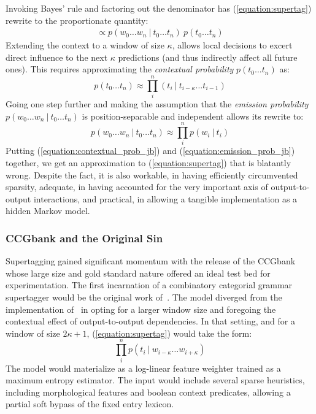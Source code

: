 Invoking Bayes' rule and factoring out the denominator has (\ref{equation:supertag}) rewrite to the proportionate quantity:
\begin{align}
\propto p(w_0\dots w_n \ | \ t_0\dots t_n)~ p(t_0\dots t_n)
\end{align}
Extending the context to a window of size $\kappa$, allows local decisions to excert direct influence to the next $\kappa$ predictions (and thus indirectly affect all future ones).
This requires approximating the \textit{contextual probability} $p(t_0 \dots t_n)$ as:
\begin{equation}\label{equation:contextual_prob_jb}
p(t_0 \dots t_n) \approx \prod_i^n (t_i \ | \ t_{i-\kappa}\dots t_{i-1})
\end{equation}
Going one step further and making the assumption that the \textit{emission probability} $p(w_0\dots w_n \ | \ t_0\dots t_n)$ is position-separable and independent allows its rewrite to:
\begin{equation}\label{equation:emission_prob_jb}
p(w_0\dots w_n \ | \ t_0\dots t_n) \approx \prod_i^n p(w_i \ | \ t_i)
\end{equation}
Putting (\ref{equation:contextual_prob_jb}) and (\ref{equation:emission_prob_jb}) together, we get an approximation to (\ref{equation:supertag}) that is blatantly wrong.
Despite the fact, it is also workable, in having efficiently circumvented sparsity, adequate, in having accounted for the very important axis of output-to-output interactions, and practical, in allowing a tangible implementation as a hidden Markov model.


\subsubsection{CCGbank and the Original Sin}
Supertagging gained significant momentum with the release of the CCGbank whose large size and gold standard nature offered an ideal test bed for experimentation.
The first incarnation of a combinatory categorial grammar supertagger would be the original work of~\citet{clark2002supertagging}.
The model diverged from the implementation of~\citet{bangalore1999supertagging} in opting for a larger window size and foregoing the contextual effect of output-to-output dependencies.
In that setting, and for a window of size $2\kappa + 1$, (\ref{equation:supertag}) would take the form:
\begin{equation}
	\prod_i^n p(t_i \ | \ w_{i-\kappa} \dots w_{i+\kappa})
\end{equation}
The model would materialize as a log-linear feature weighter trained as a maximum entropy estimator.
The input would include several sparse heuristics, including morphological features and boolean context predicates, allowing a partial soft bypass of the fixed entry lexicon.

